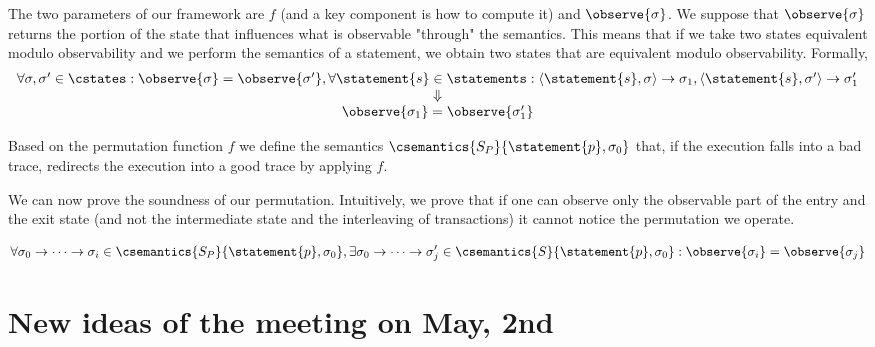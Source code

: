 The two parameters of our framework are $f$ (and a key component is how to compute it) and $\observe{\sigma}$. We suppose that $\observe{\sigma}$ returns the portion of the state that influences what is observable "through" the semantics. This means that if we take two states equivalent modulo observability and we perform the semantics of a statement, we obtain two states that are equivalent modulo observability. Formally,
\[
\begin{array}{c}
\forall \sigma, \sigma' \in \cstates : \observe{\sigma}=\observe{\sigma'} , \forall \statement{s} \in \statements : \langle \statement{s}, \sigma \rangle \to \sigma_1, \langle \statement{s}, \sigma' \rangle \to \sigma'_1\\
\Downarrow\\
\observe{\sigma_1}=\observe{\sigma'_1}\\
\end{array}
\]

Based on the permutation function $f$ we define the semantics $\csemantics{S_{P}}{\statement{p}, \sigma_0}$ that, if the execution falls into a bad trace, redirects the execution into a good trace by applying $f$.

We can now prove the soundness of our permutation. Intuitively, we prove that if one can observe only the observable part of the entry and the exit state (and not the intermediate state and the interleaving of transactions) it cannot notice the permutation we operate.

\begin{theorem}
\[
\forall \sigma_0 \to \cdots \to \sigma_i \in \csemantics{S_{P}}{\statement{p}, \sigma_0}, \exists \sigma_0 \to \cdots \to \sigma'_j \in \csemantics{S}{\statement{p}, \sigma_0} : \observe{\sigma_i} = \observe{\sigma_j}
\]
\end{theorem}






\section{New ideas of the meeting on May, 2nd}

